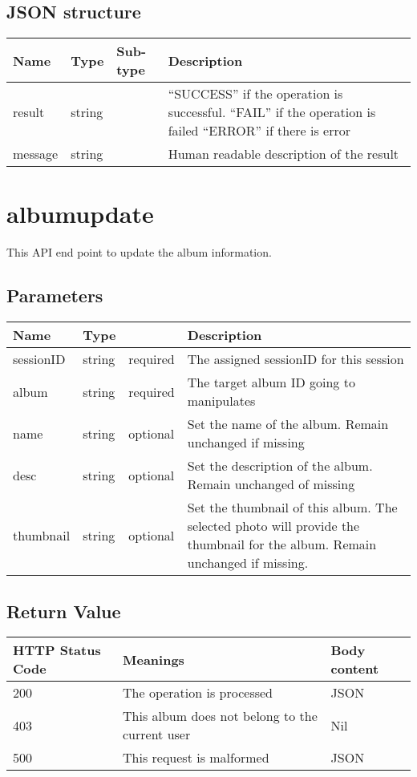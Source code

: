 \documentclass[a4paper,12pt]{report}
\begin{document}
	\subsection{JSON structure}
	\begin{tabular}{|l|l|l|p{10cm}|}
		\hline
		Name & Type & Sub-type & Description\\\hline
		result & string & & ``SUCCESS'' if the operation is successful.\newline
		``FAIL'' if the operation is failed\newline
		``ERROR'' if there is error\\\hline
		message & string & & Human readable description of the result\\\hline
	\end{tabular}
	
	\section{albumupdate}
	This API end point to update the album information.
	\subsection{Parameters}
	\begin{tabular}{|l|ll|p{10cm}|}
		\hline
		Name & Type & & Description\\\hline
		sessionID & string & required & The assigned sessionID for this session\\\hline
		album & string & required & The target album ID going to manipulates\\\hline
		name & string & optional & Set the name of the album. Remain unchanged if missing\\\hline
		desc & string & optional & Set the description of the album. Remain unchanged of missing\\\hline
		thumbnail & string& optional & Set the thumbnail of this album. The selected photo will provide the thumbnail for the album. Remain unchanged if missing.\\\hline
	\end{tabular}
	\subsection{Return Value}
	\begin{tabular}{|l|p{10cm}|l|}
		\hline
		HTTP Status Code & Meanings & Body content  \\\hline
		200 & The operation is processed & JSON\\\hline
		403 & This album does not belong to the current user & Nil\\\hline
		500 & This request is malformed & JSON\\\hline
	\end{tabular}
\end{document}

